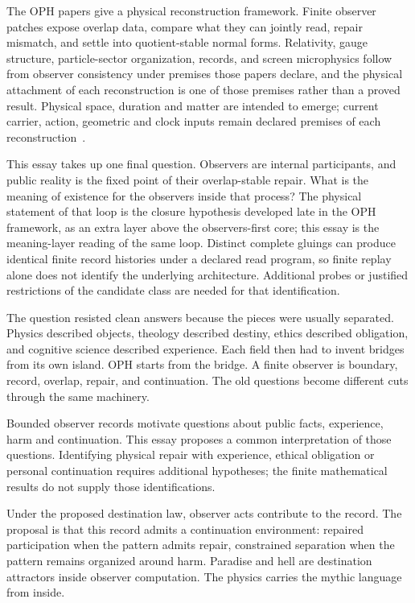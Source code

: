 \documentclass[11pt]{article}
\theoremstyle{remark}
\theoremstyle{plain}
\begin{document}
The OPH papers give a physical reconstruction framework. Finite observer
patches expose overlap data, compare what they can jointly read, repair
mismatch, and settle into quotient-stable normal forms. Relativity, gauge
structure, particle-sector organization, records, and screen microphysics
follow from observer consistency under premises those papers declare, and the
physical attachment of each reconstruction is one of those premises rather
than a proved result. Physical space, duration and matter are intended to emerge;
current carrier, action, geometric and clock inputs remain declared premises
of each reconstruction~\cite{OPHObservers,OPHEinstein,OPHGauge,OPHParticles,OPHConsensus,OPHMicro}.

This essay takes up one final question. Observers are internal participants,
and public reality is the fixed point of their overlap-stable repair. What is
the meaning of existence for the observers inside that process?
The physical statement of that loop is the closure hypothesis developed late
in the OPH framework, as an extra layer above the observers-first core; this
essay is the meaning-layer reading of the same loop.
Distinct complete gluings can produce identical finite record histories
under a declared read program, so finite replay alone does not identify the
underlying architecture. Additional probes or justified restrictions of the
candidate class are needed for that identification.

The question resisted clean answers because the pieces were usually separated.
Physics described objects, theology described destiny, ethics described
obligation, and cognitive science described experience. Each field then had to
invent bridges from its own island. OPH starts from the bridge. A finite
observer is boundary, record, overlap, repair, and continuation. The old
questions become different cuts through the same machinery.

Bounded observer records motivate questions about public facts, experience,
harm and continuation. This essay proposes a common interpretation of those
questions. Identifying physical repair with experience, ethical obligation or
personal continuation requires additional hypotheses; the finite mathematical
results do not supply those identifications.

Under the proposed destination law, observer acts contribute to the record.
The proposal is that this record admits a continuation
environment: repaired participation when the pattern admits repair, constrained
separation when the pattern remains organized around harm. Paradise and hell
are destination attractors inside observer computation. The physics carries the
mythic language from inside.
\end{document}
